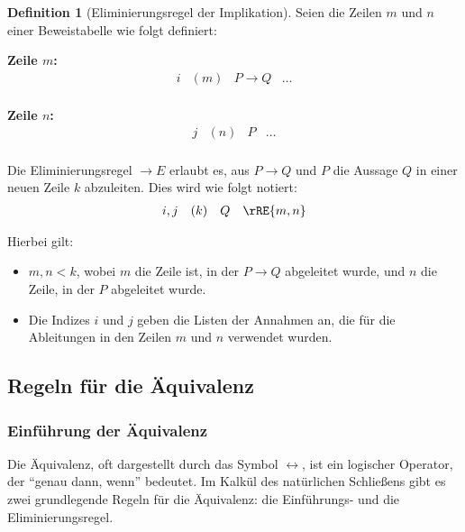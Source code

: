 \documentclass{book}
\theoremstyle{plain}
\theoremstyle{remark}
\theoremstyle{definition}
\newtheorem{definition}{Definition}[section]
\begin{document}
\begin{definition}[Eliminierungsregel der Implikation]
Seien die Zeilen \( m \) und \(n\) einer Beweistabelle wie folgt definiert:

\textbf{Zeile \( m \):}
\[
\begin{array}{llll}
    i & (m) & P \rightarrow Q & \dots \\
\end{array}
\]

\textbf{Zeile \( n \):}
\[
\begin{array}{llll}
    j & (n) & P & \dots \\
\end{array}
\]

Die Eliminierungsregel \(\rightarrow E\) erlaubt es, aus \(P \rightarrow Q\) und \(P\) die Aussage \(Q\) in einer neuen Zeile \( k \) abzuleiten. Dies wird wie folgt notiert:
\[
\begin{array}{llll}
    i, j & (k) & Q & \rRE{m,n} \\
\end{array}
\]

Hierbei gilt:
\begin{itemize}
    \item \(m, n < k\), wobei \(m\) die Zeile ist, in der \(P \rightarrow Q\) abgeleitet wurde, und \(n\) die Zeile, in der \(P\) abgeleitet wurde.
    \item Die Indizes \(i\) und \(j\) geben die Listen der Annahmen an, die für die Ableitungen in den Zeilen \(m\) und \(n\) verwendet wurden.
\end{itemize}
\end{definition}

\subsection{Regeln für die Äquivalenz}

\subsubsection{Einführung der Äquivalenz}
\label{rule:LRI}
Die Äquivalenz, oft dargestellt durch das Symbol \(\leftrightarrow\), ist ein logischer Operator, der \enquote{genau dann, wenn} bedeutet. Im Kalkül des natürlichen Schließens gibt es zwei grundlegende Regeln für die Äquivalenz: die Einführungs- und die Eliminierungsregel.
\end{document}
